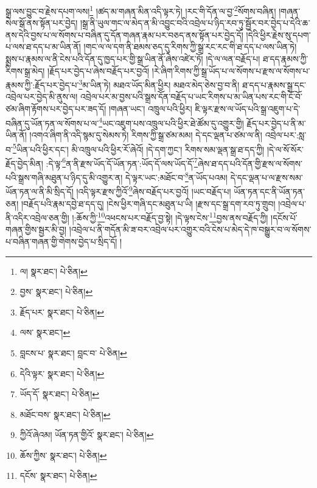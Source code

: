 སྒྲ་ལས་བྱུང་བ་རྗེས་དཔག་ལས།\footnote{ལ།  སྣར་ཐང་།  པེ་ཅིན། } །ཚད་མ་གཞན་མིན་འདི་ལྟར་ཏེ། །རང་གི་དོན་ལ་བྱ་\footnote{བྱས་  སྣར་ཐང་།  པེ་ཅིན། }སོགས་བཞིན། །གཞན་སེལ་སྒོ་ནས་སྟོན་པར་བྱེད། །སྒྲ་ནི་ཡུལ་གང་ལ་མེད་ན་མི་འབྱུང་བའི་འབྲེལ་པ་ཉིད་རབ་ཏུ་སྦྱོར་བར་བྱེད་པ་དེའི་ཆ་ནས་དེའི་བྱས་པ་ལ་སོགས་པ་བཞིན་དུ་དོན་གཞན་རྣམ་པར་བཅད་ནས་སྟོན་པར་བྱེད་དོ། །དེའི་ཕྱིར་རྗེས་སུ་དཔག་པ་ལས་ཐ་དད་པ་མ་ཡིན་ནོ། །གང་ལ་ལ་དག་ནི་ཐམས་ཅད་དུ་རིགས་ཀྱི་སྒྲ་རང་རང་གི་ཐ་དད་པ་ལས་ཡིན་ཏེ། སྨྲས་པ་རྣམས་ལ་ནི་ངེས་པའི་དོན་དུ་ཁྱད་པར་གྱི་སྒྲ་ཡིན་ནོ་ཞེས་འཛེར་ཏོ། །དེ་ལ་ལན་བརྗོད་པ། ཐ་དད་རྣམས་ཀྱི་རིགས་སྒྲ་མེད། །རྗོད་པར་བྱེད་པ་ཞེས་བརྗོད་པར་བྱའོ། །རེ་ཞིག་རིགས་ཀྱི་སྒྲ་ཡོད་པ་ལ་སོགས་པ་རྫས་ལ་སོགས་པ་རྣམས་ཀྱི་:རྗོད་པར་བྱེད་པ་\footnote{རྗོད་པར་  སྣར་ཐང་།  པེ་ཅིན། }མ་ཡིན་ཏེ། མཐའ་ཡོད་མིན་ཕྱིར། མཐའ་མེད་ཅེས་བྱ་བ་ནི། ཐ་དད་པ་རྣམས་སྒྲ་དང་འབྲེལ་པར་བྱེད་མི་ནུས་ལ། འབྲེལ་པར་མ་བྱས་པའི་སྒྲས་དོན་བརྗོད་པ་ཡང་རིགས་པ་མ་ཡིན་པས་རང་གི་ངོ་བོ་ཙམ་ཞིག་རྟོགས་པར་བྱེད་པར་ཟད་དོ། །གཞན་ཡང་། འཁྲུལ་པའི་ཕྱིར། ཇི་ལྟར་རྫས་ལ་ཡོད་པའི་སྒྲ་འཇུག་པ་དེ་བཞིན་དུ་ཡོན་ཏན་ལ་སོགས་པ་ལ་\footnote{ལས་  སྣར་ཐང་། }ཡང་འཇུག་པས་འཁྲུལ་པའི་ཕྱིར་ཐེ་ཚོམ་དུ་འགྱུར་གྱི། རྗོད་པར་བྱེད་པ་ནི་མ་ཡིན་ནོ། །འགའ་ཞིག་ནི་འདི་སྙམ་དུ་སེམས་ཏེ། རིགས་ཀྱི་སྒྲ་ཙམ་མམ། དེ་དང་ལྡན་པ་ཙམ་ལ་ནི། འབྲེལ་པར་:སླ་བ་\footnote{བླངས་པ་  སྣར་ཐང་། བླང་བ་  པེ་ཅིན། }ཡིན་པའི་ཕྱིར་དང་། མི་འཁྲུལ་པའི་ཕྱིར་རོ་ཞེའོ། །དེ་དག་ཀྱང་། རིགས་སམ་ལྡན་སྒྲ་ཐ་དད་ཀྱི། །དེ་ལ་སོ་སོར་རྗོད་བྱེད་མིན། :དེ་ལྟ་\footnote{དེའི་ལྟར་  སྣར་ཐང་།  པེ་ཅིན། }ན་ནི་རྫས་ཡོད་དོ་ཡོན་ཏན་:ཡོད་དོ་ལས་ཡོད་དོ་\footnote{ཡོད་དོ་  སྣར་ཐང་།  པེ་ཅིན། }ཞེས་ཐ་དད་པའི་དོན་གྱི་རྫས་ལ་སོགས་པའི་སྒྲས་གཞི་མཐུན་པ་ཉིད་དུ་མི་འགྱུར་ན། དེ་ལྟར་ཡང་:མཐོང་བ་\footnote{མཐོང་བས་  སྣར་ཐང་།  པེ་ཅིན། }ན་ཡོད་པའམ། དེ་དང་ལྡན་པ་ལ་རྫས་སམ་ཡོན་ཏན་ལ་ནི་མི་སྲིད་དོ། །འདི་ལྟར་རྫས་ཀྱིའོ་\footnote{ཀྱིའོ་ཞེའམ། ཡོན་ཏན་གྱིའོ་  སྣར་ཐང་།  པེ་ཅིན། }ཞེས་བརྗོད་པར་བྱའོ། །ཡང་བརྗོད་པ། ཡོན་ཏན་དང་ནི་ཡོན་ཏན་ཅན། །བརྗོད་པའི་རྣམ་དབྱེ་ཐ་དད་དུ། །ངེས་ཕྱིར་གཞི་དང་མཐུན་པ་ཡི། །རྫས་དང་སྒྲ་དག་རབ་ཏུ་གྲུབ། །འབྲེལ་པ་ནི་འདིར་འབྲེལ་ཅན་གྱི། །:ཆོས་ཀྱི་\footnote{ཆོས་ཀྱིས་  སྣར་ཐང་།  པེ་ཅིན། }འཕངས་པར་བརྗོད་བྱ་སྟེ། །དེ་ལྟས་ངེས་\footnote{དངོས་  སྣར་ཐང་།  པེ་ཅིན། }བྱས་ནས་བརྗོད་ཀྱི། །དངོས་པོ་གཞན་གྱིས་སྦྱར་མི་བྱ། །འབྲེལ་པ་ནི་གདོན་མི་ཟ་བར་འབྲེལ་པར་འགྱུར་བའི་ངེས་པ་མེད་དེ་ཁ་བསྒྱུར་བ་ལ་སོགས་པ་བཞིན་གཞན་གྱི་གེགས་བྱེད་པ་སྲིད་དོ། །
